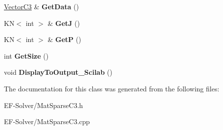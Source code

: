 \begin{DoxyCompactItemize}
\item 
\hyperlink{class_vector_c3}{Vector\+C3} \& {\bfseries Get\+Data} ()\hypertarget{class_mat_sparse_c3_a9c947b688cde1bbf3a7daf3f28444b26}{}\label{class_mat_sparse_c3_a9c947b688cde1bbf3a7daf3f28444b26}

\item 
KN$<$ int $>$ \& {\bfseries GetJ} ()\hypertarget{class_mat_sparse_c3_a000904c956166268f7c6c73d06170147}{}\label{class_mat_sparse_c3_a000904c956166268f7c6c73d06170147}

\item 
KN$<$ int $>$ \& {\bfseries GetP} ()\hypertarget{class_mat_sparse_c3_a208b1602440283d8bbab251386170441}{}\label{class_mat_sparse_c3_a208b1602440283d8bbab251386170441}

\item 
int {\bfseries Get\+Size} ()\hypertarget{class_mat_sparse_c3_a78ca20fe17ca028b13d4d1113b532208}{}\label{class_mat_sparse_c3_a78ca20fe17ca028b13d4d1113b532208}

\item 
void {\bfseries Display\+To\+Output\+\_\+\+Scilab} ()\hypertarget{class_mat_sparse_c3_ac1cdc341b34e014fd7d953d86b4e3d49}{}\label{class_mat_sparse_c3_ac1cdc341b34e014fd7d953d86b4e3d49}

\end{DoxyCompactItemize}


The documentation for this class was generated from the following files\+:\begin{DoxyCompactItemize}
\item 
E\+F-\/\+Solver/Mat\+Sparse\+C3.\+h\item 
E\+F-\/\+Solver/Mat\+Sparse\+C3.\+cpp\end{DoxyCompactItemize}
